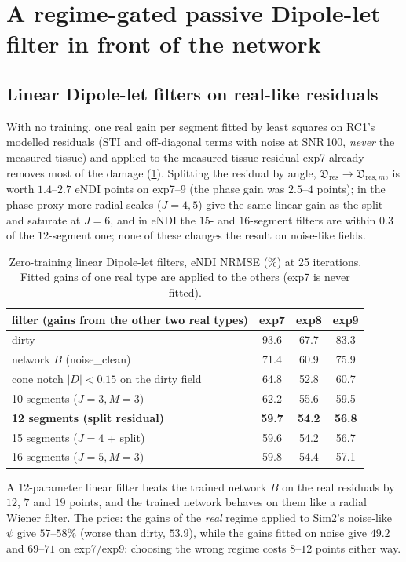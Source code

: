 \documentclass[11pt]{article}
\newcommand{\md}{\mathfrak{D}}
\newcommand{\abs}[1]{\lvert #1\rvert}
\begin{document}
\section{A regime-gated passive Dipole-let filter in front of the network}\label{sec:regime}

\subsection{Linear Dipole-let filters on real-like residuals}
With no training, one real gain per segment fitted by least squares on RC1's modelled residuals (STI and off-diagonal terms with noise at SNR\,100, \emph{never} the measured tissue) and applied to the measured tissue residual exp7 already removes most of the damage (\cref{tab:linear}). Splitting the residual by angle, $\md_{\mathrm{res}}\to\md_{\mathrm{res},m}$, is worth $1.4$--$2.7$ eNDI points on exp7--9 (the phase gain was $2.5$--$4$ points); in the phase proxy more radial scales ($J=4,5$) give the same linear gain as the split and saturate at $J=6$, and in eNDI the $15$- and $16$-segment filters are within $0.3$ of the $12$-segment one; none of these changes the result on noise-like fields.
\begin{table}[h]\centering\small
\begin{tabular}{@{}lccc@{}}
\toprule
filter (gains from the other two real types) & exp7 & exp8 & exp9 \\
\midrule
dirty & 93.6 & 67.7 & 83.3 \\
network $B$ (noise\_clean) & 71.4 & 60.9 & 75.9 \\
cone notch $\abs D<0.15$ on the dirty field & 64.8 & 52.8 & 60.7 \\
10 segments ($J=3,M=3$) & 62.2 & 55.6 & 59.5 \\
\textbf{12 segments (split residual)} & \textbf{59.7} & \textbf{54.2} & \textbf{56.8} \\
15 segments ($J=4$ + split) & 59.6 & 54.2 & 56.7 \\
16 segments ($J=5,M=3$) & 59.8 & 54.4 & 57.1 \\
\bottomrule
\end{tabular}
\caption{Zero-training linear Dipole-let filters, eNDI NRMSE (\%) at 25 iterations. Fitted gains of one real type are applied to the others (exp7 is never fitted).}\label{tab:linear}
\end{table}
A 12-parameter linear filter beats the trained network $B$ on the real residuals by $12$, $7$ and $19$ points, and the trained network behaves on them like a radial Wiener filter. The price: the gains of the \emph{real} regime applied to Sim2's noise-like $\psi$ give $57$--$58\%$ (worse than dirty, $53.9$), while the gains fitted on noise give $49.2$ and $69$--$71$ on exp7/exp9: choosing the wrong regime costs $8$--$12$ points either way.
\end{document}
